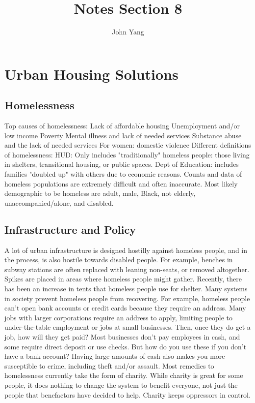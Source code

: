 \documentclass{article}
\title{Notes Section 8} %
\author{John Yang}
\begin{document}
    \maketitle
    \tableofcontents
    \section{Urban Housing Solutions}
    \subsection{Homelessness}
    \begin{outline}
        \1 Top causes of homelessness:
            \2 Lack of affordable housing 
            \2 Unemployment and/or low income
            \2 Poverty
            \2 Mental illness and lack of needed services
            \2 Substance abuse and the lack of needed services
            \2 For women: domestic violence
        \1 Different definitions of homelessness:
            \2 HUD: Only includes "traditionally" homeless people: those living in shelters, transitional housing, or public spaces. 
            \2 Dept of Education: includes families "doubled up" with others due to economic reasons. 
        \1 Counts and data of homeless populations are extremely difficult and often inaccurate. 
        \1 Most likely demographic to be homeless are adult, male, Black, not elderly, unaccompanied/alone, and disabled. 
    \end{outline}
    \subsection{Infrastructure and Policy}
    \begin{outline}
        \1 A lot of urban infrastructure is designed hostilly against homeless people, and in the process, is also hostile towards disabled people. For example, benches in subway stations are often replaced with leaning non-seats, or removed altogether. Spikes are placed in areas where homeless people might gather. 
        \1 Recently, there has been an increase in tents that homeless people use for shelter. 
        \1 Many systems in society prevent homeless people from recovering. For example, homeless people can't open bank accounts or credit cards because they require an address. Many jobs with larger corporations require an address to apply, limiting people to under-the-table employment or jobs at small businesses. 
        \1 Then, once they do get a job, how will they get paid? Most businesses don't pay employees in cash, and some require direct deposit or use checks. But how do you use these if you don't have a bank account? Having large amounts of cash also makes you more susceptible to crime, including theft and/or assault. 
        \1 Most remedies to homelessness currently take the form of charity. While charity is great for some people, it does nothing to change the system to benefit everyone, not just the people that benefactors have decided to help. Charity keeps oppressors in control. 
    \end{outline}
\end{document}
